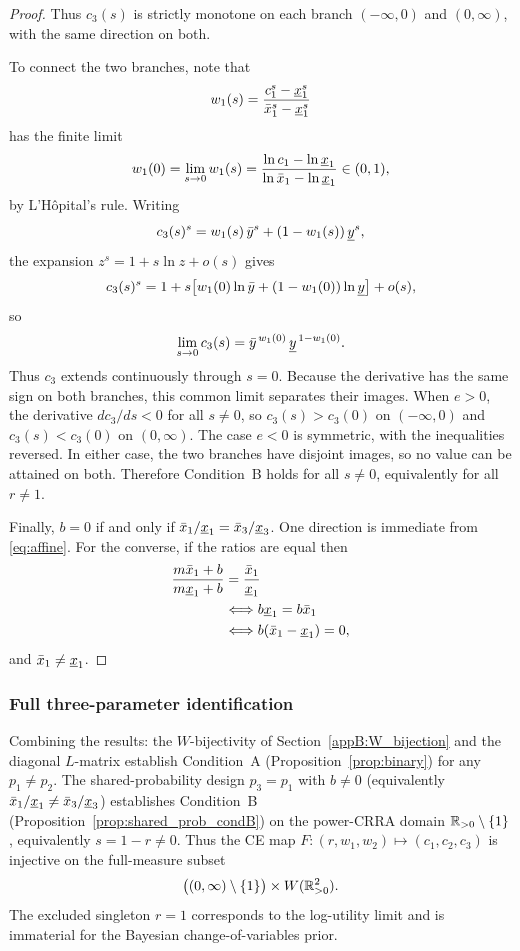 \begin{proof}
Thus $c_3(s)$ is strictly monotone on each branch
$(-\infty,0)$ and $(0,\infty)$, with the same direction on both.

To connect the two branches, note that
\[
  w_1(s) = \frac{c_1^s - \underline{x}_1^s}{\bar{x}_1^s - \underline{x}_1^s}
\]
has the finite limit
\[
  w_1(0)
  = \lim_{s \to 0} w_1(s)
  = \frac{\ln c_1 - \ln \underline{x}_1}{\ln \bar{x}_1 - \ln \underline{x}_1}
  \in (0,1),
\]
by L'H\^opital's rule. Writing
\[
  c_3(s)^s = w_1(s)\,\bar{y}^s + (1-w_1(s))\,\underline{y}^s,
\]
the expansion $z^s = 1 + s\ln z + o(s)$ gives
\[
  c_3(s)^s
  = 1 + s\bigl[w_1(0)\ln\bar{y} + (1-w_1(0))\ln\underline{y}\bigr] + o(s),
\]
so
\[
  \lim_{s \to 0} c_3(s)
  = \bar{y}^{\,w_1(0)}\,\underline{y}^{\,1-w_1(0)}.
\]
Thus $c_3$ extends continuously through $s=0$. Because the derivative has the
same sign on both branches, this common limit separates their images.
When $e > 0$, the derivative $dc_3/ds < 0$ for all $s \neq 0$, so
$c_3(s) > c_3(0)$ on $(-\infty,0)$ and $c_3(s) < c_3(0)$ on $(0,\infty)$.
The case $e < 0$ is symmetric, with the inequalities reversed. In either case,
the two branches have disjoint images, so no value can be attained on both. Therefore Condition~B holds for all $s \neq 0$,
equivalently for all $r \neq 1$.

Finally, $b = 0$ if and only if
$\bar{x}_1/\underline{x}_1 = \bar{x}_3/\underline{x}_3$. One direction is immediate from
\eqref{eq:affine}. For the converse, if the ratios are equal then
\[
  \begin{aligned}
    \frac{m\bar{x}_1 + b}{m\underline{x}_1 + b}
      &= \frac{\bar{x}_1}{\underline{x}_1} \\
      &\Longleftrightarrow b\underline{x}_1 = b\bar{x}_1 \\
      &\Longleftrightarrow b(\bar{x}_1-\underline{x}_1)=0,
  \end{aligned}
\]
and $\bar{x}_1 \neq \underline{x}_1$.
\end{proof}


\subsubsection{Full three-parameter identification}
\label{appB:full_identification}

Combining the results: the $W$-bijectivity of
Section~\ref{appB:W_bijection} and the diagonal $L$-matrix establish
Condition~A (Proposition~\ref{prop:binary}) for any $p_1 \neq p_2$.
The shared-probability design $p_3 = p_1$ with
$b \neq 0$ (equivalently $\bar{x}_1/\underline{x}_1 \neq \bar{x}_3/\underline{x}_3$) establishes Condition~B
(Proposition~\ref{prop:shared_prob_condB}) on the power-CRRA domain
$\mathbb{R}_{>0} \setminus \{1\}$, equivalently $s = 1-r \neq 0$.
Thus the CE map
$F \colon (r, w_1, w_2) \mapsto (c_1, c_2, c_3)$
is injective on the full-measure subset
\[
  \bigl((0,\infty) \setminus \{1\}\bigr) \times W(\mathbb{R}^2_{>0}).
\]
The excluded singleton $r = 1$ corresponds to the log-utility limit and is
immaterial for the Bayesian change-of-variables prior.


